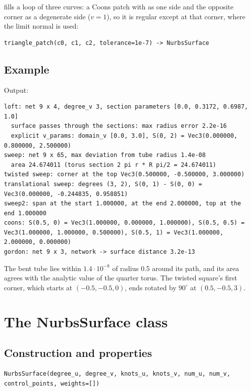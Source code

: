  fills a loop of three curves: a Coons patch with  as one side
and the opposite corner as a degenerate side ($v = 1$), so it is regular except at that corner,
where the limit normal is used:

\begin{lstlisting}[style=text]
triangle_patch(c0, c1, c2, tolerance=1e-7) -> NurbsSurface
\end{lstlisting}

\subsection{Example}


Output:

\begin{lstlisting}[style=text]
loft: net 9 x 4, degree_v 3, section parameters [0.0, 0.3172, 0.6987, 1.0]
  surface passes through the sections: max radius error 2.2e-16
  explicit v_params: domain_v [0.0, 3.0], S(0, 2) = Vec3(0.000000, 0.800000, 2.500000)
sweep: net 9 x 65, max deviation from tube radius 1.4e-08
  area 24.674011 (torus section 2 pi r * R pi/2 = 24.674011)
twisted sweep: corner at the top Vec3(0.500000, -0.500000, 3.000000)
translational sweep: degrees (3, 2), S(0, 1) - S(0, 0) = Vec3(0.000000, -0.244835, 0.958851)
sweep2: span at the start 1.000000, at the end 2.000000, top at the end 1.000000
coons: S(0.5, 0) = Vec3(1.000000, 0.000000, 1.000000), S(0.5, 0.5) = Vec3(1.000000, 1.000000, 0.500000), S(0.5, 1) = Vec3(1.000000, 2.000000, 0.000000)
gordon: net 9 x 3, network -> surface distance 3.2e-13
\end{lstlisting}

The bent tube lies within $1.4\cdot10^{-8}$ of radius 0.5 around its path, and its area agrees
with the analytic value of the quarter torus. The twisted square's first corner, which starts at
$(-0.5,-0.5,0)$, ends rotated by $90^\circ$ at $(0.5,-0.5,3)$.

\section{The NurbsSurface class}\label{sec:nurbssurface}

\subsection{Construction and properties}

\begin{lstlisting}[style=text]
NurbsSurface(degree_u, degree_v, knots_u, knots_v, num_u, num_v, control_points, weights=[])
\end{lstlisting}

